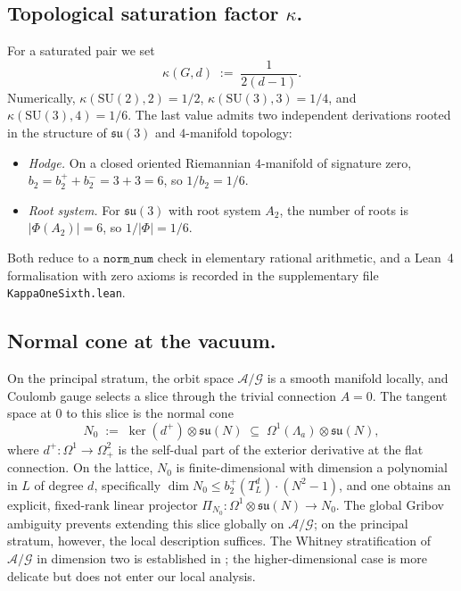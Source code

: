 \documentclass[11pt,reqno]{amsart}
\theoremstyle{plain}
\theoremstyle{definition}
\theoremstyle{remark}
\newcommand{\Lat}{\Lambda}
\newcommand{\sun}{\mathfrak{su}(N)}
\begin{document}
\subsection{Topological saturation factor $\kappa$.}
For a saturated pair we set
\[
  \kappa(G, d) \;:=\; \frac{1}{2(d-1)}.
\]
Numerically, $\kappa(\mathrm{SU}(2), 2) = 1/2$, $\kappa(\mathrm{SU}(3), 3) = 1/4$, and $\kappa(\mathrm{SU}(3), 4) = 1/6$. The last value admits two independent derivations rooted in the structure of $\mathfrak{su}(3)$ and $4$-manifold topology:
\begin{itemize}[leftmargin=*]
  \item \emph{Hodge.} On a closed oriented Riemannian $4$-manifold of signature zero, $b_2 = b_2^+ + b_2^- = 3 + 3 = 6$, so $1/b_2 = 1/6$.
  \item \emph{Root system.} For $\mathfrak{su}(3)$ with root system $A_2$, the number of roots is $|\Phi(A_2)| = 6$, so $1/|\Phi| = 1/6$.
\end{itemize}
Both reduce to a $\mathtt{norm\_num}$ check in elementary rational arithmetic, and a Lean~4 formalisation with zero axioms is recorded in the supplementary file \texttt{KappaOneSixth.lean}.

\subsection{Normal cone at the vacuum.}
On the principal stratum, the orbit space $\mathcal{A}/\mathcal{G}$ is a smooth manifold locally, and Coulomb gauge selects a slice through the trivial connection $A = 0$. The tangent space at $0$ to this slice is the normal cone
\[
  N_0 \;:=\; \ker(d^+) \otimes \sun \;\subseteq\; \Omega^1(\Lat_a) \otimes \sun,
\]
where $d^+ \colon \Omega^1 \to \Omega^2_+$ is the self-dual part of the exterior derivative at the flat connection. On the lattice, $N_0$ is finite-dimensional with dimension a polynomial in $L$ of degree $d$, specifically $\dim N_0 \le b_2^+(T^d_L) \cdot (N^2 - 1)$, and one obtains an explicit, fixed-rank linear projector $\Pi_{N_0} \colon \Omega^1 \otimes \sun \to N_0$. The global Gribov ambiguity \cite{Singer1978} prevents extending this slice globally on $\mathcal{A}/\mathcal{G}$; on the principal stratum, however, the local description suffices. The Whitney stratification of $\mathcal{A}/\mathcal{G}$ in dimension two is established in \cite{Huebschmann1996}; the higher-dimensional case is more delicate but does not enter our local analysis.

\end{document}
